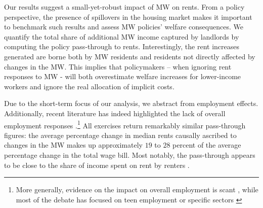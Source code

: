 Our results suggest a small-yet-robust impact of MW on rents. From a policy perspective, 
the presence of spillovers in the housing market makes it important to benchmark such 
results and assess MW policies' welfare consequences.
We quantify the total share of additional MW income captured by landlords 
by computing the policy pass-through to rents. Interestingly, the rent increases generated 
are borne both by MW residents and residents not directly affected by changes in the MW.
This implies that policymakers -- when ignoring rent responses to MW - will both overestimate 
welfare increases for lower-income workers and ignore the real allocation of implicit costs. 

Due to the short-term focus of our analysis, we abstract from employment effects. Additionally, 
recent literature has indeed highlighted the lack of overall employment responses 
\parencite{CegnizEtAl2019}.\footnote{More generally, evidence on the impact on overall 
	employment is scant \parencite{dube2019impacts}, while most of the debate has focused on 
	teen employment \parencite{card1992using, allegretto2017credible} or specific sectors 
	\parencite{katz1992effect, card2000minimum, dube2010minimum}} All exercises return 
remarkably similar pass-through figures: the average percentage change in median rents causally 
ascribed to changes in the MW makes up approximately $19$ to $28$ percent of the average 
percentage change in the total wage bill. Most notably, the pass-through appears to be close 
to the share of income spent on rent by renters \parencite{fernald2020americas}.
